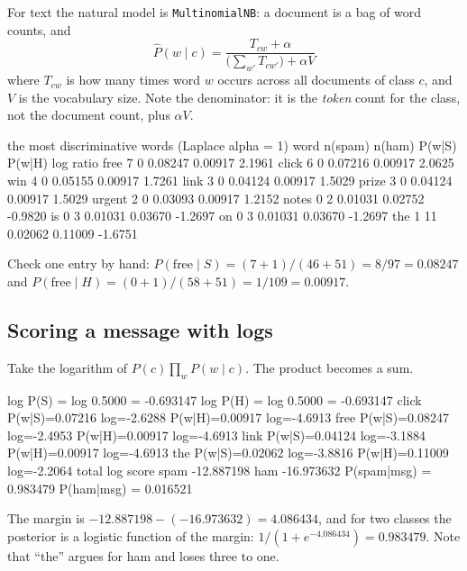 \documentclass[11pt]{article}
\begin{document}
For text the natural model is \texttt{MultinomialNB}: a document is a bag of
word counts, and
\[
  \hat{P}(w \mid c) = \frac{T_{cw} + \alpha}
                           {\bigl(\sum_{w'} T_{cw'}\bigr) + \alpha V}
\]
where $T_{cw}$ is how many times word $w$ occurs across all documents of
class $c$, and $V$ is the vocabulary size. Note the denominator: it is the
\emph{token} count for the class, not the document count, plus $\alpha V$.

\begin{codeout}
the most discriminative words (Laplace alpha = 1)
   word             n(spam)  n(ham)    P(w|S)    P(w|H)  log ratio
   free                   7       0   0.08247   0.00917     2.1961
   click                  6       0   0.07216   0.00917     2.0625
   win                    4       0   0.05155   0.00917     1.7261
   link                   3       0   0.04124   0.00917     1.5029
   prize                  3       0   0.04124   0.00917     1.5029
   urgent                 2       0   0.03093   0.00917     1.2152
   notes                  0       2   0.01031   0.02752    -0.9820
   is                     0       3   0.01031   0.03670    -1.2697
   on                     0       3   0.01031   0.03670    -1.2697
   the                    1      11   0.02062   0.11009    -1.6751
\end{codeout}

Check one entry by hand: $P(\text{free} \mid S) = (7+1)/(46+51) = 8/97
= 0.08247$ and $P(\text{free} \mid H) = (0+1)/(58+51) = 1/109 = 0.00917$.

\subsection{Scoring a message with logs}

\begin{worked}
Take the logarithm of $P(c)\prod_w P(w \mid c)$. The product becomes a sum.
\begin{codeout}
      log P(S)  = log 0.5000 = -0.693147
      log P(H)  = log 0.5000 = -0.693147
      click    P(w|S)=0.07216 log=-2.6288   P(w|H)=0.00917 log=-4.6913
      free     P(w|S)=0.08247 log=-2.4953   P(w|H)=0.00917 log=-4.6913
      link     P(w|S)=0.04124 log=-3.1884   P(w|H)=0.00917 log=-4.6913
      the      P(w|S)=0.02062 log=-3.8816   P(w|H)=0.11009 log=-2.2064
      total log score  spam -12.887198   ham -16.973632
      P(spam|msg) = 0.983479   P(ham|msg) = 0.016521
\end{codeout}
The margin is $-12.887198 - (-16.973632) = 4.086434$, and for two classes
the posterior is a logistic function of the margin:
$1/(1 + e^{-4.086434}) = 0.983479$. Note that ``the'' argues for ham and
loses three to one.
\end{worked}
\end{document}
